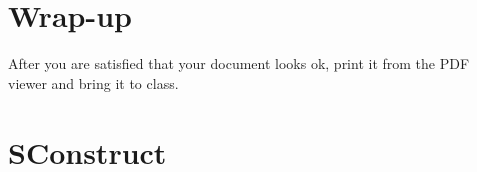 \section{Wrap-up}

After you are satisfied that your document looks ok, print it from the
PDF viewer and bring it to class.

\newpage
\section{SConstruct}
\tiny

\normalsize



